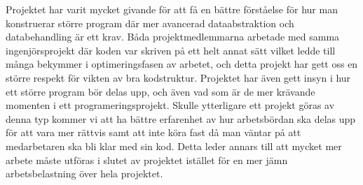 \documentclass[12pt,a4paper]{article}
\begin{document}
Projektet har varit mycket givande för att få en bättre förståelse för hur man konstruerar större program där mer avancerad dataabstraktion och databehandling är ett krav. Båda projektmedlemmarna arbetade med samma ingenjörsprojekt där koden var skriven på ett helt annat sätt vilket ledde till många bekymmer i optimeringsfasen av arbetet, och detta projekt har gett oss en större respekt för vikten av bra kodstruktur. Projektet har även gett insyn i hur ett större program bör delas upp, och även vad som är de mer krävande momenten i ett programeringsprojekt. Skulle ytterligare ett projekt göras av denna typ kommer vi att ha bättre erfarenhet av hur arbetsbördan ska delas upp för att vara mer rättvis samt att inte köra fast då man väntar på att medarbetaren ska bli klar med sin kod. Detta leder annars till att mycket mer arbete måste utföras i slutet av projektet istället för en mer jämn arbetsbelastning över hela projektet. \\
\end{document}
